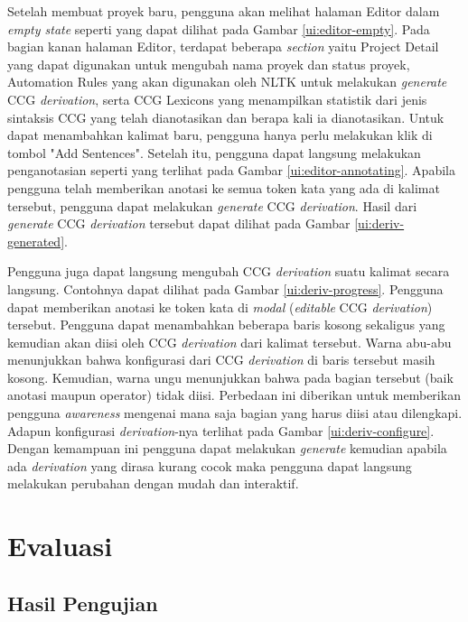 Setelah membuat proyek baru, pengguna akan melihat halaman Editor dalam
\textit{empty state} seperti yang dapat dilihat pada Gambar \ref{ui:editor-empty}.
Pada bagian kanan halaman Editor, terdapat beberapa \textit{section} yaitu
Project Detail yang dapat digunakan untuk mengubah nama proyek dan status proyek,
Automation Rules yang akan digunakan oleh NLTK untuk melakukan \textit{generate}
CCG \textit{derivation}, serta CCG Lexicons yang menampilkan statistik dari jenis
sintaksis CCG yang telah dianotasikan dan berapa kali ia dianotasikan.
Untuk dapat menambahkan kalimat baru, pengguna hanya perlu melakukan klik di
tombol "Add Sentences". Setelah itu, pengguna dapat langsung melakukan penganotasian
seperti yang terlihat pada Gambar \ref{ui:editor-annotating}. Apabila pengguna telah
memberikan anotasi ke semua token kata yang ada di kalimat tersebut, pengguna dapat
melakukan \textit{generate} CCG \textit{derivation}. Hasil dari \textit{generate} CCG
\textit{derivation} tersebut dapat dilihat pada Gambar \ref{ui:deriv-generated}.

Pengguna juga dapat langsung mengubah CCG \textit{derivation} suatu kalimat secara
langsung. Contohnya dapat dilihat pada Gambar \ref{ui:deriv-progress}.
Pengguna dapat memberikan anotasi ke token kata di \textit{modal} (\textit{editable}
CCG \textit{derivation}) tersebut. Pengguna dapat menambahkan beberapa baris kosong
sekaligus yang kemudian akan diisi oleh CCG \textit{derivation} dari kalimat tersebut.
Warna abu-abu menunjukkan bahwa konfigurasi dari CCG \textit{derivation} di baris tersebut
masih kosong. Kemudian, warna ungu menunjukkan bahwa pada bagian tersebut (baik anotasi
maupun operator) tidak diisi. Perbedaan ini diberikan untuk memberikan pengguna
\textit{awareness} mengenai mana saja bagian yang harus diisi atau dilengkapi.
Adapun konfigurasi \textit{derivation}-nya terlihat pada Gambar \ref{ui:deriv-configure}.
Dengan kemampuan ini pengguna dapat melakukan \textit{generate} kemudian apabila ada
\textit{derivation} yang dirasa kurang cocok maka pengguna dapat langsung melakukan
perubahan dengan mudah dan interaktif.



\section{Evaluasi}

\subsection{Hasil Pengujian}

